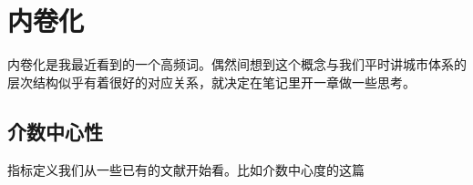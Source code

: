 \chapter{内卷化}

内卷化是我最近看到的一个高频词。偶然间想到这个概念与我们平时讲城市体系的层次结构似乎有着很好的对应关系，就决定在笔记里开一章做一些思考。

\section{介数中心性}

指标定义我们从一些已有的文献开始看。比如介数中心度的这篇~\cite{Barthelemy2018BC}